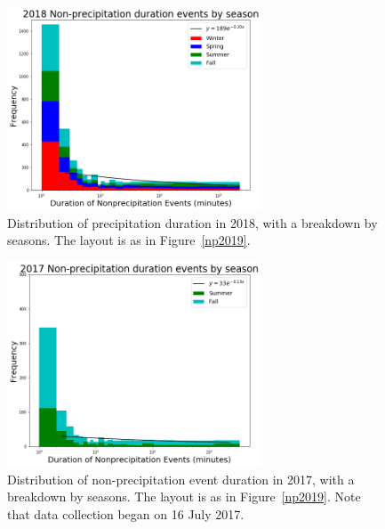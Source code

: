 \documentclass[11pt]{report}
\begin{document}
\clearpage
\begin{figure}[t]
	\centering
	\includegraphics[width=0.675\textwidth]{Figures/nonprecip_2018.png}
	\caption[Histogram of non-precipitation events for 2018 broken down by season]{\label{np2018}
		Distribution of precipitation duration in 2018, with a breakdown
		by seasons. The layout is as in Figure~\ref{np2019}.}
\end{figure}

\begin{figure}[b]
	\centering
	\includegraphics[width=0.675\textwidth]{Figures/nonprecip_2017.png}
	\caption[Histogram of non-precipitation events for 2017 broken down by
	season]{\label{np2017} Distribution of non-precipitation event duration in
		2017, with a breakdown by seasons. The layout is as in
		Figure~\ref{np2019}. Note that data collection began on 16 July
		2017.}
\end{figure}
\clearpage
\end{document}
